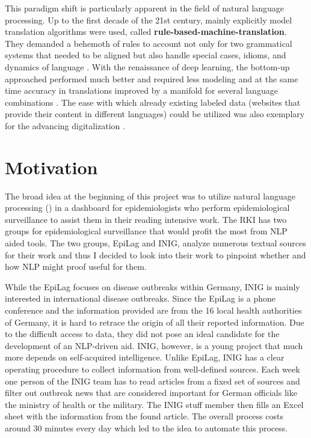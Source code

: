 This paradigm shift is particularly apparent in the field of natural language processing.
Up to the first decade of the 21st century, mainly explicitly model translation algorithms were used, called \textbf{rule-based-machine-translation}.
They demanded a behemoth of rules to account not only for two grammatical systems that needed to be aligned but also handle special cases, idioms, and dynamics of language \citep{Bar-Hillel1953, Bar-Hillel1960}.
With the renaissance of deep learning, the bottom-up approached performed much better and required less modeling and at the same time accuracy in translations improved by a manifold for several language combinations \citep{Bengio2003}.
The ease with which already existing labeled data (websites that provide their content in different languages) could be utilized was also exemplary for the advancing digitalization \citep{Macklovitch00}.

\section{Motivation}
The broad idea at the beginning of this project was to utilize natural language
processing () in a dashboard for epidemiologists who perform epidemiological
surveillance to assist them in their reading intensive work.
The RKI has two groups for epidemiological surveillance that would profit the most from NLP aided tools. The two groups, EpiLag and INIG, analyze numerous textual sources for their work and thus I decided to look into their work to pinpoint whether and how NLP might proof useful for them.

While the EpiLag focuses on disease outbreaks within Germany, INIG is mainly interested in international disease outbreaks. Since the EpiLag is a phone conference and the information provided are from the 16 local health authorities of Germany, it is hard to retrace the origin of all their reported information.
Due to the difficult access to data, they did not pose an ideal candidate for the development of an NLP-driven aid.
INIG, however, is a young project that much more depends on self-acquired intelligence.
Unlike EpiLag, INIG has a clear operating procedure to collect information from well-defined sources.
Each week one person of the INIG team has to read articles from a fixed set of sources and filter out outbreak news that are considered important for German officials like the ministry of health or the military.
The INIG stuff member then fills an Excel sheet with the information from the found article.
The overall process costs around 30 minutes every day which led to the idea to automate this process.

